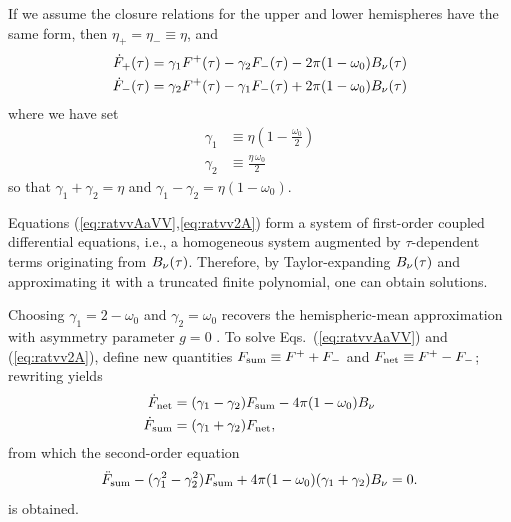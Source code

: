 If we assume the closure relations for the upper and lower hemispheres have the same form, then $\eta_+ = \eta_- \equiv \eta$, and
\begin{align}
\label{eq:ratvvAaVV}
\dot{F}_+ (\tau) &= \gamma_1 F^+ (\tau) - \gamma_2  F_- (\tau) - 2 \pi (1-\omega_0) B_\nu  (\tau) \\
 \label{eq:ratvv2A}
 \dot{F}_- (\tau) &=  \gamma_2 F^+ (\tau) - \gamma_1 F_- (\tau) + 2 \pi (1-\omega_0) B_\nu (\tau)
 \end{align}
where we have set
\begin{align}
\gamma_1 &\equiv\eta \left( 1 - \frac{\omega_0}{2}\right) \\
\gamma_2 &\equiv\frac{\eta \, \omega_0}{2}
\end{align}
so that $\gamma_1+\gamma_2=\eta$ and $\gamma_1-\gamma_2=\eta (1-\omega_0)$.

Equations (\ref{eq:ratvvAaVV},\ref{eq:ratvv2A}) form a system of first-order coupled differential equations, i.e., a homogeneous system augmented by $\tau$-dependent terms originating from $B_\nu(\tau)$. Therefore, by Taylor-expanding $B_\nu(\tau)$ and approximating it with a truncated finite polynomial, one can obtain solutions.

Choosing $\gamma_1 = 2 - \omega_0$ and $\gamma_2 = \omega_0$ recovers the hemispheric-mean approximation with asymmetry parameter $g=0$ \cite{1989JGR....9416287T}. To solve Eqs.~(\ref{eq:ratvvAaVV}) and (\ref{eq:ratvv2A}), define new quantities $F_\mathrm{sum} \equiv F^+ + F_-$ and $F_\mathrm{net} \equiv F^+ - F_-$; rewriting yields
\begin{align}
\dot{F}_\mathrm{net} &= (\gamma_1 - \gamma_2) F_\mathrm{sum} - 4 \pi (1- \omega_0) B_\nu\\
\dot{F}_\mathrm{sum} &=  (\gamma_1 + \gamma_2)  F_\mathrm{net},
\end{align}
from which the second-order equation
\begin{align}
\ddot{F}_\mathrm{sum} - (\gamma_1^2 - \gamma_2^2)  F_\mathrm{sum} + 4 \pi (1-\omega_0) (\gamma_1 + \gamma_2) B_\nu = 0.
\end{align}
is obtained.

